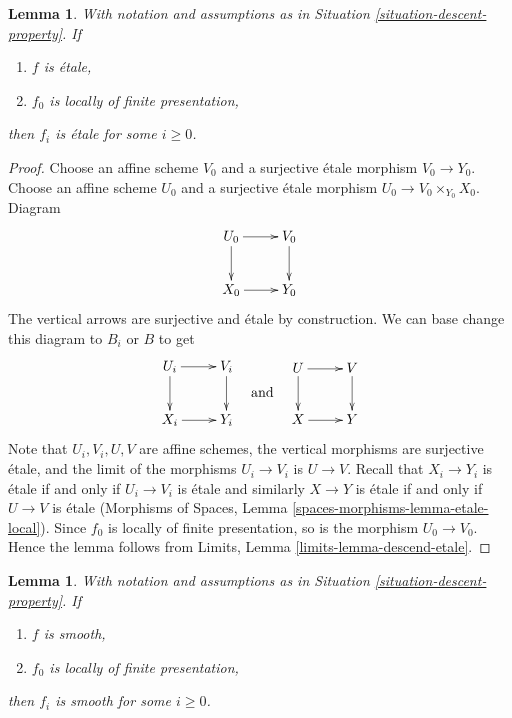 \documentclass{stacks-project}
\theoremstyle{plain}
\newtheorem{lemma}[subsection]{Lemma}
\theoremstyle{definition}
\theoremstyle{remark}
\numberwithin{equation}{subsection}
\begin{document}
\begin{lemma}
\label{lemma-descend-etale}
With notation and assumptions as in
Situation \ref{situation-descent-property}. If
\begin{enumerate}
\item $f$ is \'etale,
\item $f_0$ is locally of finite presentation,
\end{enumerate}
then $f_i$ is \'etale for some $i \geq 0$.
\end{lemma}

\begin{proof}
Choose an affine scheme $V_0$ and a surjective \'etale morphism
$V_0 \to Y_0$. Choose an affine scheme $U_0$ and a surjective \'etale
morphism $U_0 \to V_0 \times_{Y_0} X_0$. Diagram
$$
\xymatrix{
U_0 \ar[d] \ar[r] & V_0 \ar[d] \\
X_0 \ar[r] & Y_0
}
$$
The vertical arrows are surjective and \'etale by construction.
We can base change this diagram to $B_i$ or $B$ to get
$$
\vcenter{
\xymatrix{
U_i \ar[d] \ar[r] & V_i \ar[d] \\
X_i \ar[r] & Y_i
}
}
\quad\text{and}\quad
\vcenter{
\xymatrix{
U \ar[d] \ar[r] & V \ar[d] \\
X \ar[r] & Y
}
}
$$
Note that $U_i, V_i, U, V$ are affine schemes,
the vertical morphisms are surjective \'etale, and the limit of the
morphisms $U_i \to V_i$ is $U \to V$. Recall that $X_i \to Y_i$ is \'etale
if and only if $U_i \to V_i$ is
\'etale and similarly $X \to Y$ is \'etale if and only if
$U \to V$ is \'etale
(Morphisms of Spaces, Lemma \ref{spaces-morphisms-lemma-etale-local}).
Since $f_0$ is locally of finite
presentation, so is the morphism $U_0 \to V_0$. Hence the lemma follows
from Limits, Lemma \ref{limits-lemma-descend-etale}.
\end{proof}

\begin{lemma}
\label{lemma-descend-smooth}
With notation and assumptions as in
Situation \ref{situation-descent-property}. If
\begin{enumerate}
\item $f$ is smooth,
\item $f_0$ is locally of finite presentation,
\end{enumerate}
then $f_i$ is smooth for some $i \geq 0$.
\end{lemma}
\end{document}
